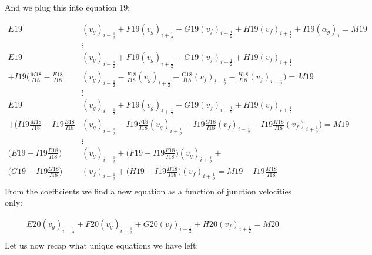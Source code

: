 \documentclass[11pt,letterpaper,titlepage]{article}
\newcommand{\half}{\frac{1}{2}}
\begin{document}
\newpage
\noindent
And we plug this into equation 19:

\begin{equation*}
\begin{aligned}
E19&(v_g)_{i-\half} + F19(v_g)_{i+\half} + G19(v_f)_{i-\half} + H19(v_f)_{i+\half} + I19(\alpha_g)_i  = M19 \\
&\vdots\\
E19&(v_g)_{i-\half} + F19(v_g)_{i+\half} + G19(v_f)_{i-\half} + H19(v_f)_{i+\half} \\
+ I19\biggr( \frac{M18}{I18} - \frac{E18}{I18}&(v_g)_{i-\half} - \frac{F18}{I18}(v_g)_{i+\half} - \frac{G18}{I18}(v_f)_{i-\half} - \frac{H18}{I18}(v_f)_{i+\half} \biggr)  = M19 \\
&\vdots\\
E19&(v_g)_{i-\half} + F19(v_g)_{i+\half} + G19(v_f)_{i-\half} + H19(v_f)_{i+\half} \\
+\biggr( I19\frac{M18}{I18} - I19\frac{E18}{I18}&(v_g)_{i-\half} - I19\frac{F18}{I18}(v_g)_{i+\half} - I19\frac{G18}{I18}(v_f)_{i-\half} - I19\frac{H18}{I18}(v_f)_{i+\half} \biggr)  = M19 \\
&\vdots\\
\biggr( E19 - I19\frac{E18}{I18} \biggr)&(v_g)_{i-\half} + \biggr( F19 - I19\frac{F18}{I18} \biggr)(v_g)_{i+\half} + \\
\biggr( G19 - I19\frac{G18}{I18} \biggr)&(v_f)_{i-\half} + \biggr( H19 - I19\frac{H18}{I18} \biggr)(v_f)_{i+\half}  = M19 - I19\frac{M18}{I18} \\
\end{aligned}
\end{equation*}
\newline
\newline
\noindent From the coefficients we find a new equation as a function of junction velocities only:

\begin{equation}
\begin{aligned}
E20(v_g)_{i-\half} + F20(v_g)_{i+\half} + G20(v_f)_{i-\half} + H20(v_f)_{i+\half}  = M20 \\
\end{aligned}
\end{equation}
\newline
\noindent
Let us now recap what unique equations we have left:
\end{document}
